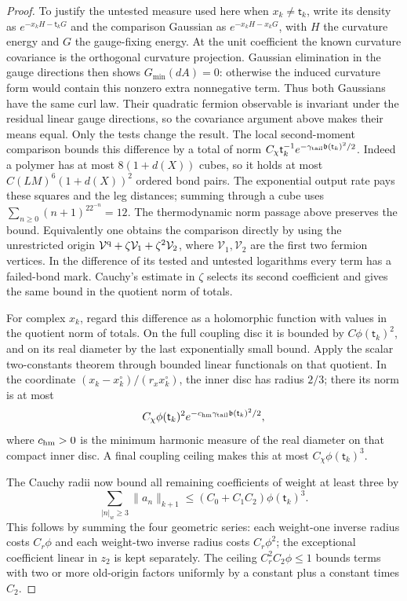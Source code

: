 \documentclass[11pt,letterpaper,reqno]{amsart}
\theoremstyle{definition}
\theoremstyle{remark}
\begin{document}
\begin{proof}
To justify the untested measure used here when $x_k\ne \mathsf t_k$,
write its density as $e^{-x_kH-\mathsf t_kG}$ and the comparison
Gaussian as $e^{-x_kH-x_kG}$, with $H$ the curvature
energy and $G$ the gauge-fixing energy.  At the unit
coefficient the known curvature covariance is the
orthogonal curvature projection.  Gaussian elimination
in the gauge directions then shows $G_{\min}(dA)=0$:
otherwise the induced curvature form would contain this
nonzero extra nonnegative term.  Thus both Gaussians
have the same curl law.  Their quadratic fermion
observable is invariant under the residual linear gauge
directions, so the covariance argument above makes
their means equal.  Only the tests change the result.
The local second-moment comparison bounds this
difference by a total of norm
$C_\chi \mathsf t_k^{-1}e^{-\gamma_{\rm tail}\mathfrak b(\mathsf t_k)^2/2}$.
Indeed a polymer has at most $8(1+d(X))$ cubes, so it
holds at most $C(LM)^6(1+d(X))^2$ ordered bond pairs.
The exponential output rate pays these squares and
the leg distances; summing through a cube uses
$\sum_{n\ge0}(n+1)^22^{-n}=12$.
The thermodynamic norm passage above preserves the bound.
Equivalently one obtains the comparison directly by
using the unrestricted origin
$\mathcal V^{\rm q}+\zeta\mathcal V_1+
\zeta^2\mathcal V_2$, where $\mathcal V_1,\mathcal V_2$
are the first two fermion vertices.  In the difference
of its tested and untested logarithms every term has
a failed-bond mark.  Cauchy's estimate in $\zeta$
selects its second coefficient and gives the same
bound in the quotient norm of totals.

For complex $x_k$, regard this difference as a holomorphic
function with values in the quotient norm of totals.
On the full coupling disc it is bounded by
$C\phi(\mathsf t_k)^2$, and on its real diameter by the last
exponentially small bound.  Apply the scalar two-constants
theorem through bounded linear functionals on that
quotient. In the coordinate $(x_k-x_k^\circ)/(r_xx_k^\circ)$,
the inner disc has radius $2/3$; there its norm is
at most
\[
 C_\chi\phi(\mathsf t_k)^2
     e^{-c_{\rm hm}\gamma_{\rm tail}\mathfrak b(\mathsf t_k)^2/2},
\]
where $c_{\rm hm}>0$ is the minimum harmonic measure of
the real diameter on that compact inner disc.  A final
coupling ceiling makes this at most
$C_\chi\phi(\mathsf t_k)^3$.

The Cauchy radii now bound all remaining coefficients
of weight at least three by
\[
 \sum_{|n|_w\ge3}\|a_n\|_{k+1}
                         \le(C_0+C_1C_2)\phi(\mathsf t_k)^3.
\]
This follows by summing the four geometric series:
each weight-one inverse radius costs $C_r\phi$ and
each weight-two inverse radius costs $C_r\phi^2$;
the exceptional coefficient linear in $z_2$ is kept
separately.  The ceiling $C_r^2C_2\phi\le1$ bounds
terms with two or more old-origin factors uniformly
by a constant plus a constant times $C_2$.


\end{proof}
\end{document}
